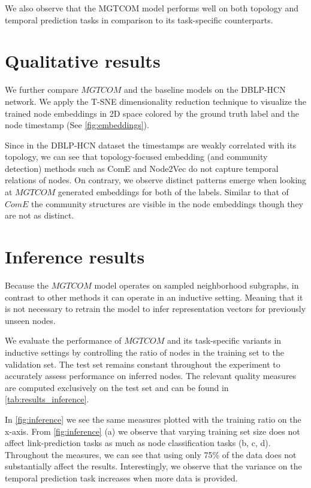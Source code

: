 We also observe that the MGTCOM model performs well on both topology and temporal prediction tasks in comparison to its task-specific counterparts. 

\section{Qualitative results}


We further compare $MGTCOM$ and the baseline models on the DBLP-HCN network.
We apply the T-SNE dimensionality reduction technique to visualize the trained node embeddings in 2D space colored by the ground truth label and the node timestamp (See \cref{fig:embeddings}).

Since in the DBLP-HCN dataset the timestamps are weakly correlated with its topology, we can see that topology-focused embedding (and community detection) methods such as ComE and Node2Vec do not capture temporal relations of nodes. On contrary, we observe distinct patterns emerge when looking at $MGTCOM$ generated embeddings for both of the labels.
%
Similar to that of $ComE$ the community structures are visible in the node embeddings though they are not as distinct.


\section{Inference results}
Because the $MGTCOM$ model operates on sampled neighborhood subgraphs, in contrast to other methods it can operate in an inductive setting.
Meaning that it is not necessary to retrain the model to infer representation vectors for previously unseen nodes.

We evaluate the performance of $MGTCOM$ and its task-specific variants in inductive settings by controlling the ratio of nodes in the training set to the validation set.
The test set remains constant throughout the experiment to accurately assess performance on inferred nodes.
The relevant quality measures are computed exclusively on the test set and can be found in \cref{tab:results_inference}.

In \cref{fig:inference} we see the same measures plotted with the training ratio on the x-axis.
From \cref{fig:inference} (a) we observe that varying training set size does not affect link-prediction tasks as much as node classification tasks (b, c, d).
Throughout the measures, we can see that using only 75\% of the data does not substantially affect the results.
Interestingly, we observe that the variance on the temporal prediction task increases when more data is provided.


